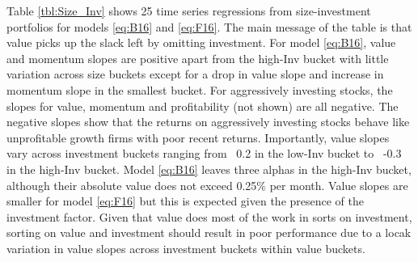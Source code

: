 
Table \ref{tbl:Size_Inv} shows 25 time series regressions from size-investment
portfolios for models \ref{eq:B16} and \ref{eq:F16}.
The main message of the table is that value picks up the slack left by
omitting investment.
For model \ref{eq:B16},
value and momentum slopes are positive apart from the high-Inv bucket
with little variation across size buckets except for a drop in value slope and
increase in momentum slope in the smallest bucket.
For aggressively investing stocks, the slopes for value, momentum and
profitability (not shown) are all negative.
The negative slopes show that the returns on aggressively investing stocks
behave like unprofitable growth firms with poor recent returns.
Importantly, value slopes vary across investment buckets ranging from ~0.2 in
the low-Inv bucket to ~-0.3 in the high-Inv bucket.
Model \ref{eq:B16} leaves three alphas in the high-Inv bucket,
although their absolute value does not exceed 0.25\% per month.
Value slopes are smaller for model \ref{eq:F16} but this is expected given the
presence of the investment factor.
Given that value does most of the work in sorts on investment, sorting on value
and investment should result in poor performance due to a locak variation in
value slopes across investment buckets within value buckets.

